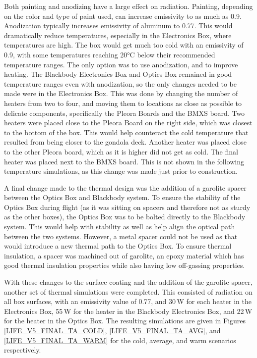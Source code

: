 Both painting and anodizing have a large effect on radiation. Painting, depending on the color and type of paint used, can increase emissivity to as much as 0.9. Anodization typically increases emissivity of aluminum to 0.77. This would dramatically reduce temperatures, especially in the Electronics Box, where temperatures are high. The box would get much too cold with an emissivity of 0.9, with some temperatures reaching 20°C below their recommended temperature ranges. The only option was to use anodization, and to improve heating. The Blackbody Electronics Box and Optics Box remained in good temperature ranges even with anodization, so the only changes needed to be made were in the Electronics Box. This was done by changing the number of heaters from two to four, and moving them to locations as close as possible to delicate components, specifically the Pleora Boards and the BMXS board. Two heaters were placed close to the Pleora Board on the right side, which was closest to the bottom of the box. This would help counteract the cold temperature that resulted from being closer to the gondola deck. Another heater was placed close to the other Pleora board, which as it is higher did not get as cold. The final heater was placed next to the BMXS board. This is not shown in the following temperature simulations, as this change was made just prior to construction.

A final change made to the thermal design was the addition of a garolite spacer between the Optics Box and Blackbody system. To ensure the stability of the Optics Box during flight (as it was sitting on spacers and therefore not as sturdy as the other boxes), the Optics Box was to be bolted directly to the Blackbody system. This would help with stability as well as help align the optical path between the two systems. However, a metal spacer could not be used as that would introduce a new thermal path to the Optics Box. To ensure thermal insulation, a spacer was machined out of garolite, an epoxy material which has good thermal insulation properties while also having low off-gassing properties.

With these changes to the surface coating and the addition of the garolite spacer, another set of thermal simulations were completed. This consisted of radiation on all box surfaces, with an emissivity value of 0.77, and 30\,W for each heater in the Electronics Box, 55\,W for the heater in the Blackbody Electronics Box, and 22\,W for the heater in the Optics Box. The resulting simulations are given in Figures \ref{LIFE_V5_FINAL_TA_COLD}, \ref{LIFE_V5_FINAL_TA_AVG}, and \ref{LIFE_V5_FINAL_TA_WARM} for the cold, average, and warm scenarios respectively. 

